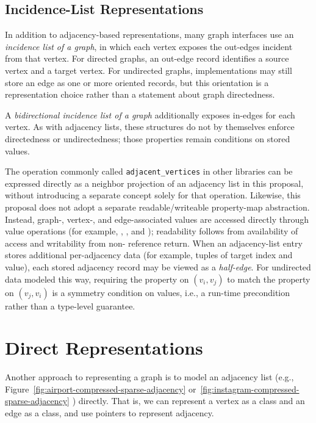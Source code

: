 \subsection{Incidence-List Representations}

In addition to adjacency-based representations, many graph interfaces use an \emph{incidence list of a graph}, in which each vertex exposes the out-edges incident from that vertex.
For directed graphs, an out-edge record identifies a source vertex and a target vertex.
For undirected graphs, implementations may still store an edge as one or more oriented records, but this orientation is a representation choice rather than a statement about graph directedness.

A \emph{bidirectional incidence list of a graph} additionally exposes in-edges for each vertex.
As with adjacency lists, these structures do not by themselves enforce directedness or undirectedness; those properties remain conditions on stored values.
 
The operation commonly called \lstinline{adjacent_vertices} in other libraries can be expressed directly as a neighbor projection of an adjacency list in this proposal, without introducing a separate concept solely for that operation.
Likewise, this proposal does not adopt a separate readable/writeable property-map abstraction.
Instead, graph-, vertex-, and edge-associated values are accessed directly through value operations (for example, , , and ); readability follows from availability of access and writability from non- reference return.
When an adjacency-list entry stores additional per-adjacency data (for example, tuples of target index and value), each stored adjacency record may be viewed as a \emph{half-edge}.
For undirected data modeled this way, requiring the property on $(v_i, v_j)$ to match the property on $(v_j, v_i)$ is a symmetry condition on values, i.e., a run-time precondition rather than a type-level guarantee.


\section{Direct Representations}

Another approach to representing a graph is to model an adjacency list (e.g., Figure~\ref{fig:airport-compressed-sparse-adjacency} or~\ref{fig:instagram-compressed-sparse-adjacency} ) directly.  That is, we can represent a vertex as a class and an edge as a class, and use pointers to represent adjacency.

